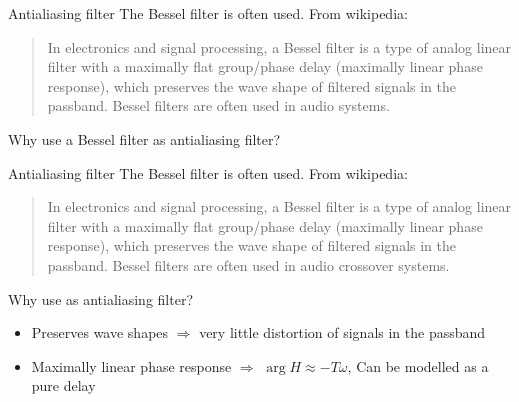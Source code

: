 \documentclass[presentation,aspectratio=169]{beamer}
\begin{document}
\begin{frame}[label={sec:org68c376d}]{Antialiasing filter}
The \alert{Bessel filter} is often used. From wikipedia:
\begin{quote}
In electronics and signal processing, a Bessel filter is a type of analog linear filter with a maximally flat group/phase delay (maximally linear phase response), which preserves the wave shape of filtered signals in the passband. Bessel filters are often used in audio systems.
\end{quote}

Why use a Bessel filter as antialiasing filter?
\end{frame}


\begin{frame}[label={sec:org5a1a866}]{Antialiasing filter}
The \alert{Bessel filter} is often used. From wikipedia:
\begin{quote}
In electronics and signal processing, a Bessel filter is a type of analog linear filter with a maximally flat group/phase delay (maximally linear phase response), which preserves the wave shape of filtered signals in the passband. Bessel filters are often used in audio crossover systems.
\end{quote}

Why use as antialiasing filter?
\begin{itemize}
\item Preserves wave shapes \(\Rightarrow\) very little distortion of signals in the passband
\item Maximally linear phase response \(\Rightarrow\) \(\arg H \approx -T\omega\),  Can be modelled as a pure delay
\end{itemize}
\end{frame}
\end{document}
